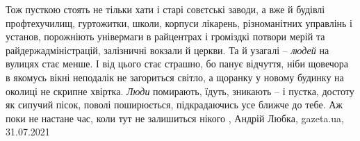 Тож пусткою стоять не тільки хати і старі совєтські заводи, а вже й будівлі
профтехучилищ, гуртожитки, школи, корпуси лікарень, різноманітних управлінь і
установ, порожніють універмаги в райцентрах і громіздкі потвори мерій та
райдержадміністрацій, залізничні вокзали й церкви. Та й узагалі – \emph{людей} на
вулицях стає менше. І від цього стає страшно, бо панує відчуття, ніби щовечора
в якомусь вікні неподалік не загориться світло, а щоранку у новому будинку на
околиці не скрипне хвіртка. \emph{Люди} помирають, їдуть, зникають – і пустка, достоту
як сипучий пісок, поволі поширюється, підкрадаючись усе ближче до тебе. Аж поки
не настане час, коли тут не залишиться нікого
, 
Андрій Любка, gazeta.ua, 31.07.2021

